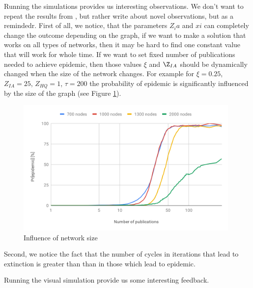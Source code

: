 \documentclass[nostrict]{szablonPG}
\begin{document}
Running the simulations provides us interesting observations. 
We don't want to repeat the results from \cite{jekon2019content}, but rather write about novel observations, but as a remindedr.
First of all, we notice, that the parameters $Z_ia$ and $xi$ can completely change the outcome depending on the graph, if we want to make a solution that works on all types of networks, then it may be hard to find one constant value that will work for whole time. If we want to set fixed number of publications needed to achieve epidemic, then those values $\xi$ and $\Z_{IA}$ should be dynamically changed when the size of the network changes.
For example for $\xi=0.25$, $Z_{IA}=25$, $Z_{HQ}=1$, $\tau=200$ the probability of epidemic is significantly influenced by the size of the graph (see Figure \ref{fig:influence-network-size}).
\begin{figure}[h!]
    \includegraphics[width=11cm]{img/Influence-of-network-size.png}
    \centering
    \caption{Influence of network size}
    \label{fig:influence-network-size}
\end{figure} 

Second, we notice the fact that the number of cycles in iterations that lead to extinction is greater than than in those which lead to epidemic.

Running the visual simulation provide us some interesting feedback. 
\end{document}
